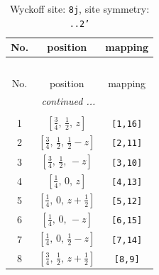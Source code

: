 \documentclass[fleqn,8pt]{jsarticle}
\begin{document}
\begin{longtable}{ccc}
\caption{Wyckoff site: {\tt 8j}, site symmetry: {\tt ..2'}}
 \\
 \hline \hline
No. & position & mapping \\ \hline \endfirsthead

\multicolumn{2}{l}{\tablename\ \thetable{}} \\
 \hline \hline
No. & position & mapping \\ \hline \endhead

 \hline \hline
\multicolumn{2}{r}{\footnotesize\it continued ...} \\ \endfoot

 \hline \hline
\multicolumn{2}{r}{} \\ \endlastfoot

1 & $\left[ \frac{3}{4},\, \frac{1}{2},\, z \right]$ & {\tt [1,16]} \\ \hline
2 & $\left[ \frac{3}{4},\, \frac{1}{2},\, \frac{1}{2} - z \right]$ & {\tt [2,11]} \\ \hline
3 & $\left[ \frac{3}{4},\, \frac{1}{2},\, - z \right]$ & {\tt [3,10]} \\ \hline
4 & $\left[ \frac{1}{4},\, 0,\, z \right]$ & {\tt [4,13]} \\ \hline
5 & $\left[ \frac{1}{4},\, 0,\, z + \frac{1}{2} \right]$ & {\tt [5,12]} \\ \hline
6 & $\left[ \frac{1}{4},\, 0,\, - z \right]$ & {\tt [6,15]} \\ \hline
7 & $\left[ \frac{1}{4},\, 0,\, \frac{1}{2} - z \right]$ & {\tt [7,14]} \\ \hline
8 & $\left[ \frac{3}{4},\, \frac{1}{2},\, z + \frac{1}{2} \right]$ & {\tt [8,9]} \\
\end{longtable}
\renewcommand{\arraystretch}{1.2}
\end{document}
